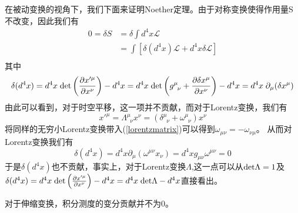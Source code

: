 在被动变换的视角下，我们下面来证明Noether定理。由于对称变换使得作用量S不改变，因此我们有
\begin{equation}
\label{nother}
\begin{aligned}
    0=\delta S&=\delta \int d^{4}x\mathcal{L}\\
    &=\int \left[\delta (d^{4}x)\mathcal{L}+d^{4}x\delta \mathcal{L}\right]\\
    \end{aligned}
\end{equation}
其中
\begin{equation}
    \delta (d^{4}x)=d^{4}x\; {\rm det}\left(\frac{\partial x'^{\mu}}{\partial x^{\nu}}\right)-d^{4}x=d^{4}x\;{\rm det}\left(g^{\mu}_{\;\;\nu}+\frac{\partial \delta x^{\mu}}{\partial x^{\nu}}\right)-d^{4}x=d^{4}x\;\partial_{\mu}(\delta x^{\mu})
\end{equation}
由此可以看到，对于时空平移，这一项并不贡献，而对于Lorentz变换，我们有
\begin{equation}
    x'^{\mu}=\Lambda^{\mu}_{\;\;\nu}x^{\nu}=(\delta^{\mu}_{\;\;\nu}+\omega^{\mu}_{\;\;\nu})x^{\nu}
\end{equation}
将同样的无穷小Lorentz变换带入(\ref{lorentzmatrix})可以得到$\omega_{\mu\nu}=-\omega_{\nu\mu}$。
从而对Lorentz变换我们有
\begin{equation}
    \delta (d^{4}x)=d^{4}x\partial_{\mu}(\omega^{\mu\nu}x_{\nu})=d^{4}xg_{\mu\nu}\omega^{\mu\nu}=0
\end{equation}
于是$\delta (d^{4}x)$也不贡献，事实上，对于Lorentz变换$\Lambda$,这一点可以从${\rm det}\Lambda=1$及$\delta (d^{4}x)=d^{4}x\; {\rm det}\left(\frac{\partial x'^{\mu}}{\partial x^{\nu}}\right)-d^{4}x=d^{4}x{\;\rm det}\Lambda-d^{4}x$直接看出。

对于伸缩变换，积分测度的变分贡献并不为0。

